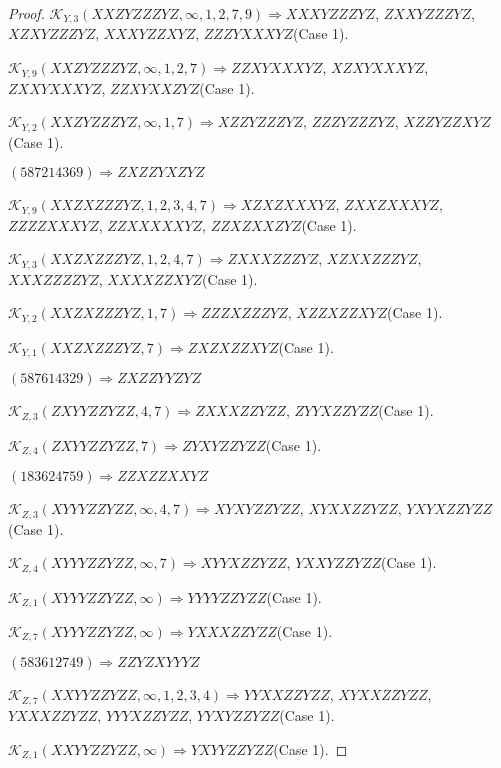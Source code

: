 \documentclass[12pt]{article}
\theoremstyle{plain}
\theoremstyle{definition}
\theoremstyle{remark}
\newcommand{\fancy}[1]{\mathcal{#1}}
\def\K{\fancy{K}}
\begin{document}
\begin{proof}
	
	
	$\K_{Y,3}(XXZYZZZYZ,\infty,1, 2, 7, 9)\Rightarrow $$XXXYZZZYZ$, $ZXXYZZZYZ$, $XZXYZZZYZ$, $XXXYZZXYZ$, $ZZZYXXXYZ$(Case 1).
	
	$\K_{Y,9}(XXZYZZZYZ,\infty,1, 2, 7)\Rightarrow $$ZZXYXXXYZ$, $XZXYXXXYZ$, $ZXXYXXXYZ$, $ZZXYXXZYZ$(Case 1).
	
	$\K_{Y,2}(XXZYZZZYZ,\infty,1, 7)\Rightarrow $$XZZYZZZYZ$, $ZZZYZZZYZ$, $XZZYZZXYZ$(Case 1).
	
	
	
	$(5 8 7 2 1 4 3 6 9)\Rightarrow ZXZZYXZYZ$
	
	
	
	$\K_{Y,9}(XXZXZZZYZ,1, 2, 3, 4, 7)\Rightarrow $$XZXZXXXYZ$, $ZXXZXXXYZ$, $ZZZZXXXYZ$, $ZZXXXXXYZ$, $ZZXZXXZYZ$(Case 1).
	
	$\K_{Y,3}(XXZXZZZYZ,1, 2, 4, 7)\Rightarrow $$ZXXXZZZYZ$, $XZXXZZZYZ$, $XXXZZZZYZ$, $XXXXZZXYZ$(Case 1).
	
	$\K_{Y,2}(XXZXZZZYZ,1, 7)\Rightarrow $$ZZZXZZZYZ$, $XZZXZZXYZ$(Case 1).
	
	$\K_{Y,1}(XXZXZZZYZ,7)\Rightarrow $$ZXZXZZXYZ$(Case 1).
	
	
	
	$(5 8 7 6 1 4 3 2 9)\Rightarrow ZXZZYYZYZ$
	
	
	
	$\K_{Z,3}(ZXYYZZYZZ,4, 7)\Rightarrow $$ZXXXZZYZZ$, $ZYYXZZYZZ$(Case 1).
	
	$\K_{Z,4}(ZXYYZZYZZ,7)\Rightarrow $$ZYXYZZYZZ$(Case 1).
	
	
	
	$(1 8 3 6 2 4 7 5 9)\Rightarrow ZZXZZXXYZ$
	
	
	
	$\K_{Z,3}(XYYYZZYZZ,\infty,4, 7)\Rightarrow $$XYXYZZYZZ$, $XYXXZZYZZ$, $YXYXZZYZZ$(Case 1).
	
	$\K_{Z,4}(XYYYZZYZZ,\infty,7)\Rightarrow $$XYYXZZYZZ$, $YXXYZZYZZ$(Case 1).
	
	$\K_{Z,1}(XYYYZZYZZ,\infty)\Rightarrow $$YYYYZZYZZ$(Case 1).
	
	$\K_{Z,7}(XYYYZZYZZ,\infty)\Rightarrow $$YXXXZZYZZ$(Case 1).
	
	
	
	$(5 8 3 6 1 2 7 4 9)\Rightarrow ZZYZXYYYZ$
	
	
	
	$\K_{Z,7}(XXYYZZYZZ,\infty,1, 2, 3, 4)\Rightarrow $$YYXXZZYZZ$, $XYXXZZYZZ$, $YXXXZZYZZ$, $YYYXZZYZZ$, $YYXYZZYZZ$(Case 1).
	
	$\K_{Z,1}(XXYYZZYZZ,\infty)\Rightarrow $$YXYYZZYZZ$(Case 1).
	

\end{proof}
\end{document}
